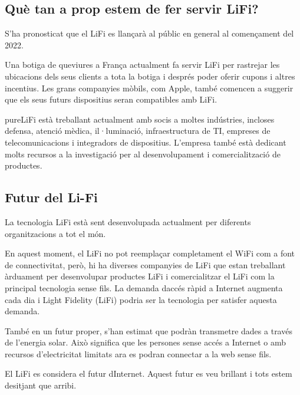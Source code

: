 


\subsection*{Què tan a prop estem de fer servir LiFi?}
S'ha pronosticat que el LiFi es llançarà al públic en general al començament del 2022.

Una botiga de queviures a França actualment fa servir LiFi per rastrejar les ubicacions dels seus clients a tota la botiga i després poder oferir cupons i altres incentius. Les grans companyies mòbils, com Apple, també comencen a suggerir que els seus futurs dispositius seran compatibles amb LiFi.

pureLiFi està treballant actualment amb socis a moltes indústries, incloses defensa, atenció mèdica, il·luminació, infraestructura de TI, empreses de telecomunicacions i integradors de dispositius. L'empresa també està dedicant molts recursos a la investigació per al desenvolupament i comercialització de productes.



\subsection*{Futur del Li-Fi}


La tecnologia LiFi està sent desenvolupada actualment per diferents organitzacions a tot el món.

En aquest moment, el LiFi no pot reemplaçar completament el WiFi com a font de connectivitat, però, hi ha diverses companyies de LiFi que estan treballant àrduament per desenvolupar productes LiFi i comercialitzar el LiFi com la principal tecnologia sense fils. La demanda daccés ràpid a Internet augmenta cada dia i Light Fidelity (LiFi) podria ser la tecnologia per satisfer aquesta demanda.

També en un futur proper, s'han estimat que podràn transmetre dades a través de l'energia solar. Això significa que les persones sense accés a Internet o amb recursos d'electricitat limitats ara es podran connectar a la web sense fils.

El LiFi es considera el futur dInternet. Aquest futur es veu brillant i tots estem desitjant que arribi.
